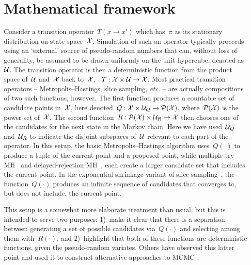 \documentclass[angelino.tex]{subfiles}
\begin{document}
\section{Mathematical framework}
\label{sec:mathematical-framework}

Consider a transition operator~${T(x \to x')}$ which has~$\pi$ as its stationary 
distribution on state space~${\mathcal X}$.
Simulation of such an operator typically proceeds using an `external' source of 
pseudo-random numbers that can, without loss of generality, be assumed to be
drawn uniformly on the unit hypercube, denoted as~$\mathcal{U}$.
The transition operator is then a deterministic function from the product space 
of~$\mathcal{U}$ and~${\mathcal X}$ back to~${\mathcal X}$, \ie~${T:{\mathcal X}\times\mathcal{U}\to{\mathcal X}}$.
Most practical transition operators -- Metropolis--Hastings, slice sampling,
{\it etc.} -- are actually compositions of two such functions, however.
The first function produces a countable set of candidate points in~${\mathcal X}$, here denoted~${Q:{\mathcal X}\times\mathcal{U}_Q\to\mathcal{P}({\mathcal X})}$, where~$\mathcal{P}({\mathcal X})$ is the power set of~${\mathcal X}$.  The second function~${R:\mathcal{P}({\mathcal X})\times\mathcal{U}_R\to{\mathcal X}}$ then chooses one of the candidates for the next state in the Markov chain.  Here we have used~$\mathcal{U}_Q$ and~$\mathcal{U}_R$ to indicate the disjoint subspaces of~$\mathcal{U}$ relevant to each part of the operator.
In this setup, the basic Metropolis--Hastings algorithm uses~$Q(\cdot)$
to produce a tuple of the current point and a proposed point, while
multiple-try MH~\citep{liu:2000-multiple-try} and
delayed-rejection MH~\citep{tierney:1999-adaptive,green:2001-delayed-rejection},
each create a larger candidate set that includes the current point.
In the exponential-shrinkage variant of slice sampling~\citep{neal:2003-slice},
the function~$Q(\cdot)$ produces an infinite sequence of candidates that
converges to, but does not include, the current point.

This setup is a somewhat more elaborate treatment than usual, but this is intended to serve two purposes: 1)~make it clear that there is a separation between generating a set of possible candidates via~$Q(\cdot)$ and selecting among them with~$R(\cdot)$, and 2)~highlight that both of these functions are deterministic functions, given the pseudo-random variates.
Others have observed this latter point and used it to construct alternative 
approaches to MCMC~\citep{propp-wilson-1996a, neal:2012a-permutation}.
\end{document}
